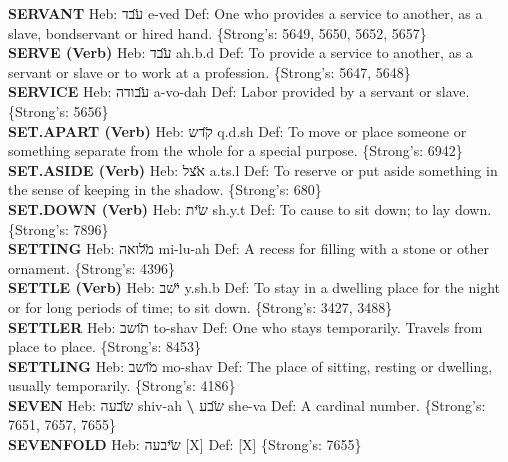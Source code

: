 {\textbf{SERVANT} Heb: {\large\H עבד} e-ved Def: One who provides a service to another, as a slave, bondservant or hired hand. \{Strong's: 5649, 5650, 5652, 5657\}\hfill{}\\

\textbf{SERVE (Verb)} Heb: {\large\H עבד} ah.b.d Def: To provide a service to another, as a servant or slave or to work at a profession. \{Strong's: 5647, 5648\}\hfill{}\\

\textbf{SERVICE} Heb: {\large\H עבודה} a-vo-dah Def: Labor provided by a servant or slave. \{Strong's: 5656\}\hfill{}\\

\textbf{SET.APART (Verb)} Heb: {\large\H קדש} q.d.sh Def: To move or place someone or something separate from the whole for a special purpose. \{Strong's: 6942\}\hfill{}\\

\textbf{SET.ASIDE (Verb)} Heb: {\large\H אצל} a.ts.l Def: To reserve or put aside something in the sense of keeping in the shadow. \{Strong's: 680\}\hfill{}\\

\textbf{SET.DOWN (Verb)} Heb: {\large\H שית} sh.y.t Def: To cause to sit down; to lay down. \{Strong's: 7896\}\hfill{}\\

\textbf{SETTING} Heb: {\large\H מלואה} mi-lu-ah Def: A recess for filling with a stone or other ornament. \{Strong's: 4396\}\hfill{}\\

\textbf{SETTLE (Verb)} Heb: {\large\H ישב} y.sh.b Def: To stay in a dwelling place for the night or for long periods of time; to sit down. \{Strong's: 3427, 3488\}\hfill{}\\

\textbf{SETTLER} Heb: {\large\H תושב} to-shav Def: One who stays temporarily. Travels from place to place. \{Strong's: 8453\}\hfill{}\\

\textbf{SETTLING} Heb: {\large\H מושב} mo-shav Def: The place of sitting, resting or dwelling, usually temporarily. \{Strong's: 4186\}\hfill{}\\

\textbf{SEVEN} Heb: {\large\H שבעה} shiv-ah \textbf{\textbackslash{}} {\large\H שבע} she-va Def: A cardinal number. \{Strong's: 7651, 7657, 7655\}\hfill{}\\

\textbf{SEVENFOLD} Heb: {\large\H שיבעה} {[}X{]} Def: {[}X{]} \{Strong's: 7655\}\hfill{}\\

}
